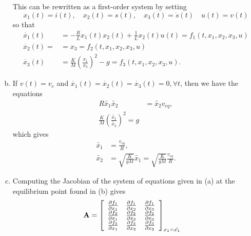 \documentclass{article}
\begin{document}
\begin{enumerate}[(a)]
{        This can be rewritten as a first-order system by setting
        $$
              x_1(t) = i(t), 
        \quad x_2(t) = s(t),
        \quad x_3(t) = \dot{s}(t)
        \quad u(t)   = v(t)
        $$
        so that
        \begin{align*}
          \dot{x_1}(t) 
          &= -\frac{R}{L} x_1(t) x_2(t) + \frac{1}{L} x_2(t) u(t) 
           = f_1(t, x_1, x_2, x_3, u)\\
          \dot{x_2}(t) =
          &= x_3 = f_2(t, x_1, x_2, x_3, u)\\
          \dot{x_3}(t)
          &= \frac{K}{M}\left(\frac{x_1}{x_2}\right)^2 - g
           = f_3(t, x_1, x_2, x_3, u).
        \end{align*}
       }
  \item{ If $v(t) = v_e$ and 
         $\dot{x_1}(t) = \dot{x_2}(t) =  \dot{x_3}(t) = 0, \forall t$, 
         then we have the equations
         \begin{align*}
         R \tilde{x_1} \tilde{x_2} &= \tilde{x_2} v_{eq},\\
         \frac{K}{M}\left(\frac{\tilde{x_1}}{\tilde{x_2}}\right)^2 = g
         \end{align*}
         which gives
         \begin{align*}
         \tilde{x_1} &= \frac{v_{eq}}{R}, \\
         \tilde{x_2} &= \sqrt{\frac{K}{gM}} \tilde{x_1}
                      = \sqrt{\frac{K}{gM}}\frac{v_{eq}}{R}.
         \end{align*}
       }
       \item{ Computing the Jacobian of the system of equations given
              in (a) at the equilibrium point found in (b) gives
           \begin{align*}
              \mathbf{A}
              &= \left[\begin{array}{c c c}
                 \frac{\partial f_1}{\partial x_1}
              &  \frac{\partial f_1}{\partial x_2}
              &  \frac{\partial f_1}{\partial x_3} \\
                 \frac{\partial f_2}{\partial x_1}
              &  \frac{\partial f_2}{\partial x_2}
              &  \frac{\partial f_2}{\partial x_3} \\
                 \frac{\partial f_3}{\partial x_1}
              &  \frac{\partial f_3}{\partial x_2}
              &  \frac{\partial f_3}{\partial x_3}
                 \end{array}\right]_{\substack{x_1 = \tilde{x_1} \\
}}
\end{align*}}
\end{enumerate}
\end{document}
